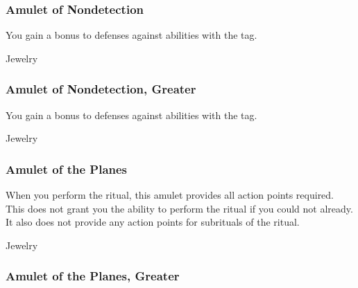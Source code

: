 \lowercase{\hypertarget{item:Amulet of Nondetection}{}}\label{item:Amulet of Nondetection}
\hypertarget{item:Amulet of Nondetection}{\subsubsection{Amulet of Nondetection\hfill{}}}

You gain a  bonus to defenses against abilities with the  tag.



 


 Jewelry


\lowercase{\hypertarget{item:Amulet of Nondetection, Greater}{}}\label{item:Amulet of Nondetection, Greater}
\hypertarget{item:Amulet of Nondetection, Greater}{\subsubsection{Amulet of Nondetection, Greater\hfill{}}}

You gain a  bonus to defenses against abilities with the  tag.



 


 Jewelry


\lowercase{\hypertarget{item:Amulet of the Planes}{}}\label{item:Amulet of the Planes}
\hypertarget{item:Amulet of the Planes}{\subsubsection{Amulet of the Planes\hfill{}}}

When you perform the  ritual, this amulet provides all action points required.
This does not grant you the ability to perform the  ritual if you could not already.
It also does not provide any action points for subrituals of the  ritual.



 


 Jewelry


\lowercase{\hypertarget{item:Amulet of the Planes, Greater}{}}\label{item:Amulet of the Planes, Greater}
\hypertarget{item:Amulet of the Planes, Greater}{\subsubsection{Amulet of the Planes, Greater\hfill{}}}

